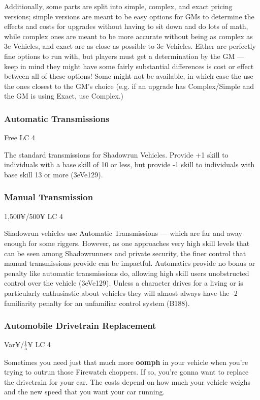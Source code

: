 \begin{multicols*}{2}
	Additionally, some parts are split into simple, complex, and exact pricing versions; simple versions are meant to be easy options for GMs to determine the effects and costs for upgrades without having to sit down and do lots of math, while complex ones are meant to be more accurate without being as complex as 3e Vehicles, and exact are as close as possible to 3e Vehicles. Either are perfectly fine options to run with, but players must get a determination by the GM — keep in mind they might have some fairly substantial differences is cost or effect between all of these options! Some might not be available, in which case the use the ones closest to the GM's choice (e.g. if an upgrade has Complex/Simple and the GM is using Exact, use Complex.)
	
	\subsubsection{Automatic Transmissions}
	Free LC 4
	
	The standard transmissions for Shadowrun Vehicles. Provide +1 skill to individuals with a base skill of 10 or less, but provide -1 skill to individuals with base skill 13 or more (3eVe129).
	
	\subsubsection{Manual Transmission}
	1,500¥/500¥ LC 4

	Shadowrun vehicles use Automatic Transmissions — which are far and away	enough for some riggers. However, as one approaches very high skill levels that can be seen among Shadowrunners and private security, the finer control that manual transmissions provide can be impactful. Automatics provide no bonus or penalty like automatic transmissions do, allowing high skill users unobstructed control over the vehicle (3eVe129). Unless a character drives for a living or is particularly enthusiastic about vehicles they will almost always have the -2 familiarity penalty for an unfamiliar control system (B188).
	
	\subsubsection{Automobile Drivetrain Replacement}
	Var¥/$\frac{1}{5}$¥ LC 4
	
	Sometimes you need just that much more \textbf{oomph} in your vehicle when you're trying to outrun those Firewatch choppers. If so, you're gonna want to replace the drivetrain for your car. The costs depend on how much your vehicle weighs and the new speed that you want your car running.
	

\end{multicols*}
